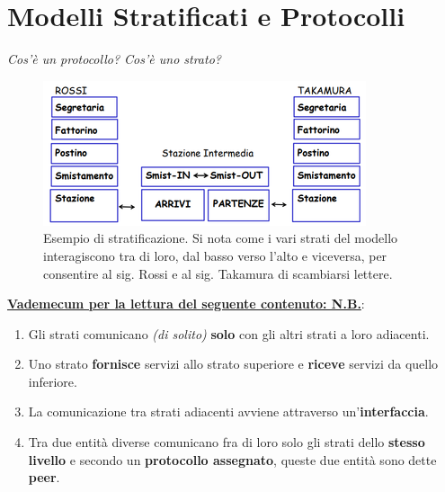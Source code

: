 \documentclass[11pt,a4paper]{article}
\theoremstyle{definition}
\begin{document}
\section{Modelli Stratificati e Protocolli}
\textit{Cos'è un protocollo? Cos'è uno strato?}

\begin{figure}[!h]
	\includegraphics[scale=0.7]{Immagini/Postale.png}
	\centering
	\caption{Esempio di stratificazione. Si nota come i vari strati del modello interagiscono tra di loro, dal basso verso l'alto e viceversa, per consentire al sig. Rossi e al sig. Takamura di scambiarsi lettere.}
\end{figure}
\textbf{\underline{Vademecum per la lettura del seguente contenuto: N.B.}}:
\begin{enumerate}
	\item Gli strati comunicano \textit{(di solito)} \textbf{solo} con gli altri strati a loro adiacenti.
	\item Uno strato \textbf{fornisce} servizi allo strato superiore e \textbf{riceve} servizi da quello inferiore.
	\item La comunicazione tra strati adiacenti avviene attraverso un'\textbf{interfaccia}.
	\item Tra due entità diverse comunicano fra di loro solo gli strati dello \textbf{stesso livello} e secondo un \textbf{protocollo assegnato}, queste due entità sono dette \textbf{peer}.
\end{enumerate}
\newpage
\end{document}
